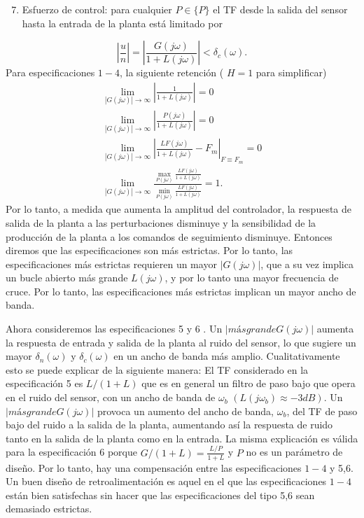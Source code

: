 \begin{enumerate}
  \setcounter{enumi}{6}
  \item Esfuerzo de control: para cualquier $P \in\{P\}$ el TF desde la salida del sensor hasta la entrada de la planta está limitado por
\end{enumerate}
$$
\left|\frac{u}{n}\right|=\left|\frac{G(j \omega)}{1+L(j \omega)}\right|<\delta_{c}(\omega) .
$$
Para especificaciones $1-4$, la siguiente retención ( $H=1$ para simplificar)
$$
\begin{array}{ll}
\lim _{| G(j \omega)| \rightarrow \infty}\left|\frac{1}{1+L(j \omega)}\right|=0 \\
\lim _{| G(j \omega)| \rightarrow \infty}\left|\frac{P(j \omega)}{1+L(j \omega)}\right|=0 \\
\lim _{| G(j \omega)| \rightarrow \infty}\left|\frac{L F(j \omega)}{1+L(j \omega)}-F_{m}\right|_{F \equiv F_{m}}=0 \\
\lim _{| G(j \omega)| \rightarrow \infty} \frac{\max _{P(j \omega)} \frac{L F(j \omega)}{1+L(j \omega)}}{\min _{P(j \omega)} \frac{L F(j \omega)}{1+L(j \omega)}}=1 .
\end{array}
$$
Por lo tanto, a medida que aumenta la amplitud del controlador, la respuesta de salida de la planta a las perturbaciones disminuye y la sensibilidad de la producción de la planta a los comandos de seguimiento disminuye. Entonces diremos que las especificaciones son más estrictas. Por lo tanto, las especificaciones más estrictas requieren un mayor $ | G(j \omega)|$, que a su vez implica un bucle abierto más grande $L(j \omega)$, y por lo tanto una mayor frecuencia de cruce. Por lo tanto, las especificaciones más estrictas implican un mayor ancho de banda.

Ahora consideremos las especificaciones 5 y 6 . Un $| más grande G(j \omega)|$ aumenta la respuesta de entrada y salida de la planta al ruido del sensor, lo que sugiere un mayor $\delta_{n}(\omega)$ y $\delta_{c}(\omega)$ en un ancho de banda más amplio. Cualitativamente esto se puede explicar de la siguiente manera: El TF considerado en la especificación 5 es $L /(1+L)$ que es en general un filtro de paso bajo que opera en el ruido del sensor, con un ancho de banda de $\omega_{b}$ $\left(L\left(j \omega_{b}\right) \approx-3 d B\right)$. Un $| más grande G(j \omega)|$ provoca un aumento del ancho de banda, $\omega_{b}$, del TF de paso bajo del ruido a la salida de la planta, aumentando así la respuesta de ruido tanto en la salida de la planta como en la entrada. La misma explicación es válida para la especificación 6 porque $G /(1+L)=\frac{L / P}{1+L}$ y $P$ no es un parámetro de diseño. Por lo tanto, hay una compensación entre las especificaciones $ 1-4$ y 5,6. Un buen diseño de retroalimentación es aquel en el que las especificaciones $ 1-4$ están bien satisfechas sin hacer que las especificaciones del tipo 5,6 sean demasiado estrictas.


